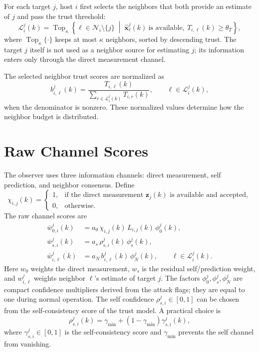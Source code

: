 \documentclass[11pt]{article}
\newcommand{\N}{\mathcal{N}}
\newcommand{\Lset}{\mathcal{L}}
\newcommand{\TopK}{\operatorname{Top}_{\kappa}}
\begin{document}
For each target \(j\), host \(i\) first selects the neighbors that both provide
an estimate of \(j\) and pass the trust threshold:
\begin{equation}
    \Lset_i^j(k)
    =
    \TopK
    \left\{
        \ell \in \N_i \setminus \{j\}
        \; \middle| \;
        \hat{\bm{x}}_{\ell}^{j}(k) \ \text{is available},
        \ T_{i,\ell}(k) \geq \theta_T
    \right\},
    \label{eq:trusted_set}
\end{equation}
where \(\TopK\{\cdot\}\) keeps at most \(\kappa\) neighbors, sorted by
descending trust. The target \(j\) itself is not used as a neighbor source for
estimating \(j\); its information enters only through the direct measurement
channel.

The selected neighbor trust scores are normalized as
\begin{equation}
    b_{i,\ell}^{j}(k)
    =
    \frac{T_{i,\ell}(k)}
    {\sum_{r\in\Lset_i^j(k)} T_{i,r}(k)},
    \qquad
    \ell\in\Lset_i^j(k),
    \label{eq:neighbor_basis}
\end{equation}
when the denominator is nonzero. These normalized values determine how the
neighbor budget is distributed.

\section{Raw Channel Scores}

The observer uses three information channels: direct measurement, self
prediction, and neighbor consensus. Define
\[
    \chi_{i,j}(k)=
    \begin{cases}
        1, & \text{if the direct measurement } \bm{z}_j(k) \text{ is available and accepted},\\
        0, & \text{otherwise}.
    \end{cases}
\]
The raw channel scores are
\begin{align}
    \bar{w}_{0,i}^{j}(k)
    &=
    a_0 \, \chi_{i,j}(k) \, L_{i,j}(k) \, \phi_0^j(k),
    \label{eq:raw_direct}
    \\
    \bar{w}_{s,i}^{j}(k)
    &=
    a_s \, \rho_{s,i}^{j}(k) \, \phi_s^j(k),
    \label{eq:raw_self}
    \\
    \bar{w}_{i,\ell}^{j}(k)
    &=
    a_N \, b_{i,\ell}^{j}(k) \, \phi_N^j(k),
    \qquad \ell\in\Lset_i^j(k).
    \label{eq:raw_neighbor}
\end{align}
Here \(w_0\) weights the direct measurement, \(w_s\) is the residual
self/prediction weight, and \(w_{i,\ell}^{j}\) weights neighbor \(\ell\)'s
estimate of target \(j\). The factors \(\phi_0^j,\phi_s^j,\phi_N^j\) are
compact confidence multipliers derived from the attack flags; they are equal to
one during normal operation. The self confidence \(\rho_{s,i}^{j}\in[0,1]\)
can be chosen from the self-consistency score of the trust model. A practical
choice is
\begin{equation}
    \rho_{s,i}^{j}(k)
    =
    \gamma_{\min} + (1-\gamma_{\min})\gamma_{s,i}^{j}(k),
    \label{eq:self_confidence}
\end{equation}
where \(\gamma_{s,i}^{j}\in[0,1]\) is the self-consistency score and
\(\gamma_{\min}\) prevents the self channel from vanishing.
\end{document}
